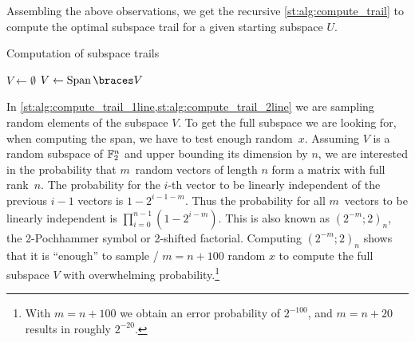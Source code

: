 Assembling the above observations, we get the recursive \cref{st:alg:compute_trail} to compute the optimal subspace trail for a given starting subspace $U$.
\begin{algorithm}
\caption{Computation of subspace trails}\label{st:alg:compute_trail}
\begin{algorithmic}[1]
    \Statex{}
        \State{}
    \EndIf{}
    \State{}$V \leftarrow \emptyset$
        \label{st:alg:compute_trail_1line}
            \label{st:alg:compute_trail_2line}
        \EndFor{}
    \EndFor{}
    \State{}$V \leftarrow \Span{V}$
    \State{}
    \EndFunction{}
\end{algorithmic}
\end{algorithm}
In \cref{st:alg:compute_trail_1line,st:alg:compute_trail_2line} we are sampling random elements of the subspace $V$.
To get the full subspace we are looking for, when computing the span, we have to test enough random~$x$.
Assuming $V$ is a random subspace of $\mathbb{F}_2^n$ and upper bounding its dimension by $n$, we are interested in the probability that $m$~random vectors of length $n$ form a matrix with full rank~$n$.
The probability for the $i$-th vector to be linearly independent of the previous $i-1$ vectors is $1-2^{i-1-m}$.
Thus the probability for all $m$~vectors to be linearly independent is $\prod_{i=0}^{n-1}(1-2^{i-m})$.
This is also known as ${(2^{-m}; 2)}_n$, the 2-Pochhammer symbol or 2-shifted factorial.
Computing ${(2^{-m}; 2)}_n$ shows that it is \enquote{enough} to sample \eg/ $m = n+100$ random $x$ to compute the full subspace $V$ with overwhelming probability.\footnote{%
    With $m = n+100$ we obtain an error probability of $2^{-100}$, and $m=n+20$ results in roughly $2^{-20}$.
}

